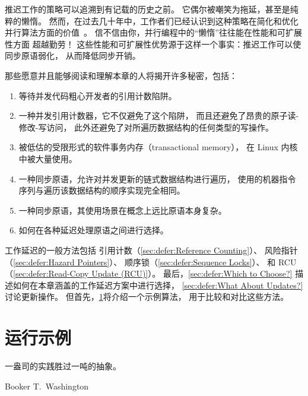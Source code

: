 
%

推迟工作的策略可以追溯到有记载的历史之前。
它偶尔被嘲笑为拖延，甚至是纯粹的懒惰。
然而，在过去几十年中，工作者们已经认识到这种策略在简化和优化
并行算法方面的价值~\cite{Kung80,
HMassalinPhD,ValerieAurora2008Synthesis}。
信不信由你，并行编程中的``懒惰''往往能在性能和可扩展性方面
超越勤劳！
这些性能和可扩展性优势源于这样一个事实：推迟工作可以使同步原语弱化，
从而降低同步开销。

那些愿意并且能够阅读和理解本章的人将揭开许多秘密，包括：

\begin{enumerate}
\item	等待并发代码粗心开发者的引用计数陷阱。
\label{sec:defer:Mysteries reference-counting trap}
\item	一种并发引用计数器，它不仅避免了这个陷阱，
	而且还避免了昂贵的原子读-修改-写访问，
	此外还避免了对所遍历数据结构的任何类型的写操作。
\label{sec:defer:Mysteries hazard pointers}
\item	被低估的受限形式的软件事务内存（transactional memory），
	在 Linux 内核中被大量使用。
\label{sec:defer:Mysteries sequence locking}
\item	一种同步原语，允许对并发更新的链式数据结构进行遍历，
	使用的机器指令序列与遍历该数据结构的顺序实现完全相同。
\label{sec:defer:Mysteries RCU}
\item	一种同步原语，其使用场景在概念上远比原语本身复杂。
\label{sec:defer:Mysteries RCU Use Cases}
\item	如何在各种延迟处理原语之间进行选择。
\label{sec:defer:Mysteries Which to choose}
\end{enumerate}

工作延迟的一般方法包括
引用计数（\cref{sec:defer:Reference Counting}）、
风险指针（\cref{sec:defer:Hazard Pointers}）、
顺序锁（\cref{sec:defer:Sequence Locks}）、
和 RCU（\cref{sec:defer:Read-Copy Update (RCU)}）。
最后，\cref{sec:defer:Which to Choose?}
描述如何在本章涵盖的工作延迟方案中进行选择，
\cref{sec:defer:What About Updates?}
讨论更新操作。
但首先，\cref{sec:defer:Running Example}将介绍一个示例算法，
用于比较和对比这些方法。

\section{运行示例}
\label{sec:defer:Running Example}
%
\epigraph{一盎司的实践胜过一吨的抽象。}
	 {Booker T.~Washington}


